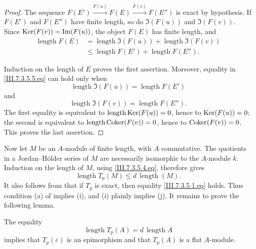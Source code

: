 \begin{proof}
The sequence $F(E')\xrightarrow{F(u)}F(E)\xrightarrow{F(v)}F(E'')$
is exact by hypothesis.  If $F(E')$ and $F(E'')$ have finite
length, so do $\Im(F(u))$ and $\Im(F(v))$.  Since
$\operatorname{Ker}(F(v))=\operatorname{Im}(F(u))$, the object $F(E)$ has finite length,
and
\[
  \begin{split}
  \operatorname{length}F(E)
  &=
  \operatorname{length}\Im(F(u))
  +
  \operatorname{length}\Im(F(v))
  \\
  &\leq
  \operatorname{length}F(E')
  +
  \operatorname{length}F(E'').
  \end{split}
  \tag{7.3.5.5}\label{III.7.3.5.5.eq}
\]


Induction on the length of $E$ proves the first assertion.
Moreover, equality in \eqref{III.7.3.5.5.eq} can hold only when
\[
  \operatorname{length}\Im(F(u))
  =
  \operatorname{length}F(E')
\]
and
\[
  \operatorname{length}\Im(F(v))
  =
  \operatorname{length}F(E'').
\]
The first equality is equivalent to
$\operatorname{length}\operatorname{Ker}(F(u))=0$, hence to $\operatorname{Ker}(F(u))=0$;
the second is equivalent to
$\operatorname{length}\operatorname{Coker}(F(v))=0$, hence to
$\operatorname{Coker}(F(v))=0$.  This proves the last assertion.
\end{proof}

Now let $M$ be an $A$-module of finite length, with $A$
commutative.  The quotients in a Jordan--H\"older series of
$M$ are necessarily isomorphic to the $A$-module $k$.
Induction on the length of $M$, using
\eqref{III.7.3.5.4.eq}, therefore gives
\[
  \operatorname{length}T_p(M)
  \leq
  d\,\operatorname{length}(M).
  \tag{7.3.5.6}\label{III.7.3.5.6.eq}
\]
It also follows from  that if $T_p$ is exact,
then equality \eqref{III.7.3.5.1.eq} holds.  Thus condition
(a) of  implies (i), and (i) plainly implies
(j).  It remains to prove the following lemma.

\begin{lemma}[7.3.5.7]
\label{III.7.3.5.7}
The equality
\[
  \operatorname{length}T_p(A)
  =
  d\,\operatorname{length}A
\]
implies that $T_p(\varepsilon)$ is an epimorphism and that
$T_p(A)$ is a flat $A$-module.
\end{lemma}

